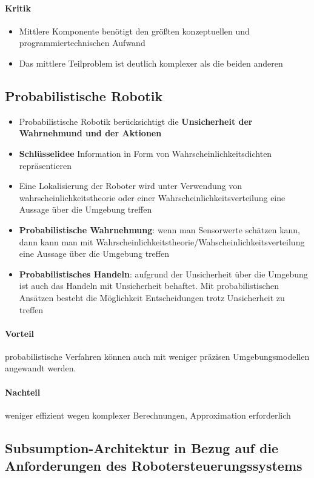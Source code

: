 \paragraph{Kritik}
\begin{itemize}
	\item Mittlere Komponente benötigt den größten konzeptuellen und programmiertechnischen Aufwand
	\item Das mittlere Teilproblem ist deutlich komplexer als die beiden anderen
\end{itemize}
\subsection{Probabilistische Robotik}
\begin{itemize}
	\item Probabilistische Robotik berücksichtigt die \textbf{Unsicherheit der Wahrnehmund und der Aktionen}
	\item \textbf{Schlüsselidee} Information in Form von Wahrscheinlichkeitsdichten repräsentieren
	\item Eine Lokalisierung der Roboter wird unter Verwendung von wahrscheinlichkeitstheorie oder einer Wahrscheinlichkeitsverteilung eine Aussage über die Umgebung treffen
	\item \textbf{Probabilistische Wahrnehmung}: wenn man Sensorwerte schätzen kann, dann kann man mit Wahrscheinlichkeitstheorie/Wahscheinlichkeitsverteilung eine Aussage über die Umgebung treffen
	\item \textbf{Probabilistisches Handeln}: aufgrund der Unsicherheit über die Umgebung ist auch das Handeln mit Unsicherheit behaftet.
	Mit probabilistischen Ansätzen besteht die Möglichkeit Entscheidungen trotz Unsicherheit zu treffen
\end{itemize}
\paragraph{Vorteil} probabilistische Verfahren können auch mit weniger präzisen Umgebungsmodellen angewandt werden.
\paragraph{Nachteil} weniger effizient wegen komplexer Berechnungen, Approximation erforderlich
\subsection{Subsumption-Architektur in Bezug auf die Anforderungen des Robotersteuerungssystems}
